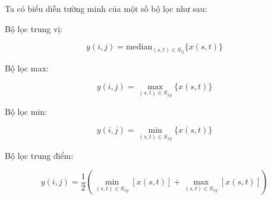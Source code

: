 Ta có biểu diễn tường minh của một số bộ lọc như sau:

Bộ lọc trung vị:

$$y(i,j) = \text{median}_{(s,t) \in S_{ij}}{\{x(s,t)\}}$$

Bộ lọc max:

$$y(i,j) = \max_{(s,t) \in S_{xy}}{\{x(s,t)\}}$$

Bộ lọc min:

$$y(i,j) = \min_{(s,t) \in S_{xy}}{\{x(s,t)\}}$$

Bộ lọc trung điểm:

$$y(i,j) = \frac{1}{2} \left ( \min_{(s,t) \in S_{xy}}[x(s,t)] + \max_{(s,t) \in S_{xy}}[x(s,t)]\right )$$